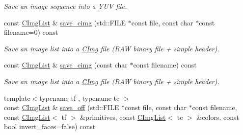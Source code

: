 \begin{DoxyCompactItemize}
\begin{DoxyCompactList}\small\item\em Save an image sequence into a YUV file. \item\end{DoxyCompactList}\item 
const \hyperlink{structcimg__library_1_1_c_img_list}{CImgList} \& \hyperlink{structcimg__library_1_1_c_img_list_af0a1d766b2ad5acff467cddb8d108475}{save\_\-cimg} (std::FILE $\ast$const file, const char $\ast$const filename=0) const 
\begin{DoxyCompactList}\small\item\em Save an image list into a \hyperlink{structcimg__library_1_1_c_img}{CImg} file (RAW binary file + simple header). \item\end{DoxyCompactList}\item 
\hypertarget{structcimg__library_1_1_c_img_list_a9401ecac7b6ea3c3c42038e7bb2b3ff5}{
const \hyperlink{structcimg__library_1_1_c_img_list}{CImgList} \& \hyperlink{structcimg__library_1_1_c_img_list_a9401ecac7b6ea3c3c42038e7bb2b3ff5}{save\_\-cimg} (const char $\ast$const filename) const }
\label{structcimg__library_1_1_c_img_list_a9401ecac7b6ea3c3c42038e7bb2b3ff5}

\begin{DoxyCompactList}\small\item\em Save an image list into a \hyperlink{structcimg__library_1_1_c_img}{CImg} file (RAW binary file + simple header). \item\end{DoxyCompactList}\item 
\hypertarget{structcimg__library_1_1_c_img_list_a1af6b43d79747f976444a8f292074fb4}{
{\footnotesize template$<$typename tf , typename tc $>$ }\\const \hyperlink{structcimg__library_1_1_c_img_list}{CImgList} \& \hyperlink{structcimg__library_1_1_c_img_list_a1af6b43d79747f976444a8f292074fb4}{save\_\-off} (std::FILE $\ast$const file, const char $\ast$const filename, const \hyperlink{structcimg__library_1_1_c_img_list}{CImgList}$<$ tf $>$ \&primitives, const \hyperlink{structcimg__library_1_1_c_img_list}{CImgList}$<$ tc $>$ \&colors, const bool invert\_\-faces=false) const }
\label{structcimg__library_1_1_c_img_list_a1af6b43d79747f976444a8f292074fb4}


\end{DoxyCompactItemize}
